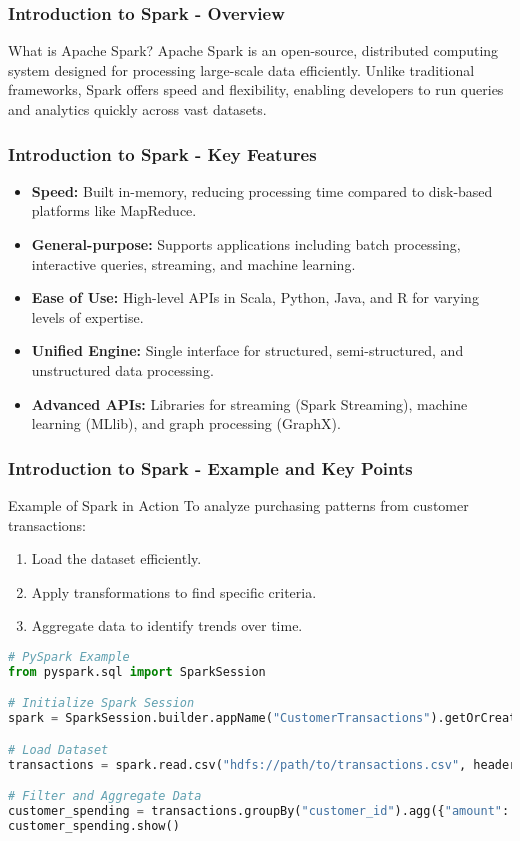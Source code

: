 \documentclass[aspectratio=169]{beamer}
\begin{document}
\begin{frame}[fragile]
    \frametitle{Introduction to Spark - Overview}
    \begin{block}{What is Apache Spark?}
        Apache Spark is an open-source, distributed computing system designed for processing large-scale data efficiently. 
        Unlike traditional frameworks, Spark offers speed and flexibility, enabling developers to run queries and analytics quickly across vast datasets.
    \end{block}
\end{frame}

\begin{frame}[fragile]
    \frametitle{Introduction to Spark - Key Features}
    \begin{itemize}
        \item \textbf{Speed:} Built in-memory, reducing processing time compared to disk-based platforms like MapReduce.
        \item \textbf{General-purpose:} Supports applications including batch processing, interactive queries, streaming, and machine learning.
        \item \textbf{Ease of Use:} High-level APIs in Scala, Python, Java, and R for varying levels of expertise.
        \item \textbf{Unified Engine:} Single interface for structured, semi-structured, and unstructured data processing.
        \item \textbf{Advanced APIs:} Libraries for streaming (Spark Streaming), machine learning (MLlib), and graph processing (GraphX).
    \end{itemize}
\end{frame}

\begin{frame}[fragile]
    \frametitle{Introduction to Spark - Example and Key Points}
    \begin{block}{Example of Spark in Action}
        To analyze purchasing patterns from customer transactions:
        \begin{enumerate}
            \item Load the dataset efficiently.
            \item Apply transformations to find specific criteria.
            \item Aggregate data to identify trends over time.
        \end{enumerate}
        \begin{lstlisting}[language=Python]
# PySpark Example
from pyspark.sql import SparkSession

# Initialize Spark Session
spark = SparkSession.builder.appName("CustomerTransactions").getOrCreate()

# Load Dataset
transactions = spark.read.csv("hdfs://path/to/transactions.csv", header=True)

# Filter and Aggregate Data
customer_spending = transactions.groupBy("customer_id").agg({"amount": "sum"})
customer_spending.show()
        \end{lstlisting}
    \end{block}
\end{frame}
\end{document}
